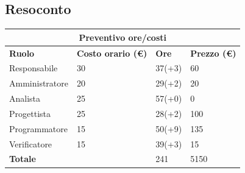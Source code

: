 \documentclass[12pt]{article}
\begin{document}
\subsection{Resoconto}
\begin{center}
    \begin{tabularx}{\textwidth}{|X|X|X|X|}
        \hline
        \multicolumn{4}{|c|}{\textbf{Preventivo ore/costi}}\\
        \hline
        \hline
        \textbf{Ruolo} & \textbf{Costo orario (\euro)} & \textbf{Ore} & \textbf{Prezzo (\euro)}\\
        \hline
        Responsabile    & 30 & 37(+3)  & 60\\
        \hline
        Amministratore  & 20 & 29(+2)  & 20\\
        \hline
        Analista        & 25 & 57(+0)  & 0\\
        \hline
        Progettista     & 25 & 28(+2)  & 100\\
        \hline
        Programmatore   & 15 & 50(+9)  & 135\\
        \hline
        Verificatore    & 15 & 39(+3)  & 15\\
        \hline
        \hline
        \textbf{Totale} &    & 241 &  5150 \\
        \hline
    \end{tabularx}\\[8pt]
    \mbox{}\\   
\end{center}
\end{document}
